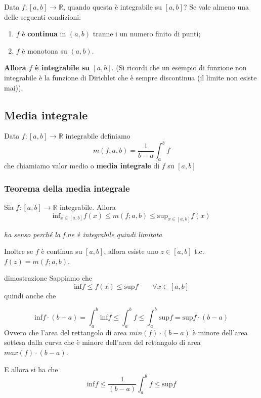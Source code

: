 \documentclass[x11names]{article}
\begin{document}
	Data $f: [a,b] \to \mathbb{R}$, quando questa è integrabile su $[a,b]$? Se vale almeno una delle seguenti condizioni:
	\begin{enumerate}
		\item $f$ è \textbf{continua} in $(a,b)$ tranne i un numero finito di punti;
		\item $f$ è monotona su $(a,b)$.
	\end{enumerate}
	\textbf{Allora $f$ è integrabile su $[a,b]$}. (Si ricordi che un esempio di funzione non integrabile è la funzione di Dirichlet che è sempre discontinua (il limite non esiste mai)).
	
	\subsection{Media integrale}
	Data $f: [a,b] \to \mathbb{R}$ integrabile definiamo
	\[
	m(f;a,b) = \frac{1}{b-a}\int_{a}^{b}f 
	\]
	che chiamiamo valor medio o \textbf{media integrale} di $f$ su $[a,b]$
	\begin{center}
		\colorbox{myred}{\begin{minipage}{5.75in}
				\begin{redes}{}
					\subsubsection{Teorema della media integrale}
					Sia $f: [a,b] \to \mathbb{R}$ integrabile. Allora
					\[
					\text{inf}_{x \in [a,b]} f(x) \leq m(f;a,b) \leq \text{sup}_{x \in [a,b]} f(x)
					\]
					\begin{center}
					\textit{ha senso perché la f.ne è integrabile quindi limitata}	
					\end{center}
					
					Inoltre se $f$ è continua su $[a,b]$, allora esiste uno $z \in [a,b]$ t.c. $f(z) = m(f;a,b)$.
				\end{redes}
		\end{minipage}}        
	\end{center}
	
	\begin{es}{dimostrazione}
		Sappiamo che 
		\[
		\text{inf}f \leq f(x) \leq \text{sup}f \qquad \forall x \in [a,b]
 		\]
 		quindi anche che
 		
 		\[
 		\text{inf}f \cdot (b-a) = \int_{a}^{b}\text{inf}f \leq \int_{a}^{b}f \leq \int_{a}^{b}\text{sup}f = \text{sup}f \cdot (b-a)
 		\]
 		Ovvero che l'area del rettangolo di area $min(f)\cdot (b-a)$ è minore dell'area sottesa dalla curva che è minore dell'area del rettangolo di area $max(f)\cdot (b-a)$.
 		
 		E allora si ha che
 		\[
 		\text{inf}f \leq \frac{1}{(b-a)}\int_{a}^{b}f \leq  \text{sup}f
 		\]
 		
	\end{es}
	
\end{document}
